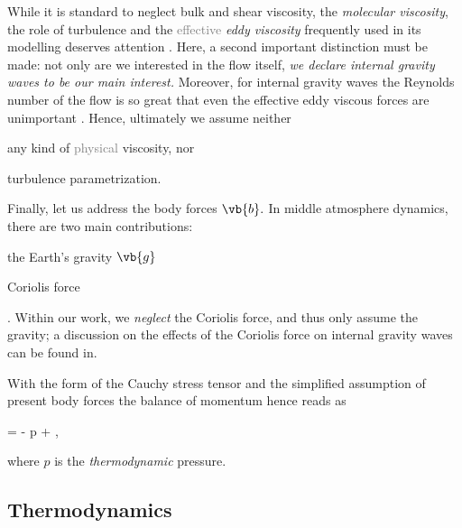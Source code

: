 \documentclass[../main.tex]{subfiles}
\begin{document}
While it is standard to neglect bulk and shear viscosity, \ie the \emph{molecular viscosity}, the role of turbulence and the \textcolor{gray}{effective} \emph{eddy viscosity} frequently used in its modelling deserves attention \autocite[p.~5]{smagorinskyGENERALCIRCULATIONEXPERIMENTS1963}\autocite[p.~93]{popeTurbulentFlows2000}. Here, a second important distinction must be made: not only are we interested in the flow itself, \emph{we declare internal gravity waves to be our main interest.} Moreover, for internal gravity waves the Reynolds number of the flow is so great that even the effective eddy viscous forces are unimportant \autocite[p.~30]{sutherlandInternalGravityWaves2010}. Hence, ultimately we assume neither \begin{inparaenum} \item any kind of \textcolor{gray}{physical} viscosity\sidenotemark, nor \item turbulence parametrization. \end{inparaenum} 

Finally, let us address the body forces $\vb{b}.$ In middle atmosphere dynamics, there are two main contributions: \begin{inparaenum} \item the Earth's gravity $\vb{g}$ \item Coriolis force \end{inparaenum}. Within our work, we \emph{neglect} the Coriolis force, and thus only assume the gravity; a discussion on the effects of the Coriolis force on internal gravity waves can be found in\autocite[p.~206]{sutherlandInternalGravityWaves2010}.

With the form of the Cauchy stress tensor  and the simplified assumption of present body forces the balance of momentum  hence reads as

\begin{equations}[single,!,numberline=all]
\label{eq:MOMENTUM_EQ}
\rho {} = - \grad p + \rho {},
\end{equations}

where $p$ is the \emph{thermodynamic} pressure. 

\subsection{Thermodynamics}
\label{sec:THERMODYNAMICS}
\end{document}
